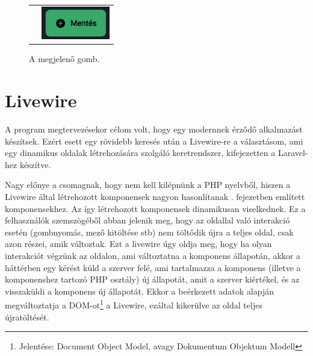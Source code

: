 \documentclass[
]{thesis-ekf}
\theoremstyle{definition}
\theoremstyle{remark}
\begin{document}
\begin{figure}[ht!]
	\begin{tabular}{p{}p{}}
		\begin{minipage}{.6\textwidth}
			
		\end{minipage}
		&
		\begin{minipage}{.4\textwidth}
			\centering
			\caption{A megjelenő gomb.}
			\includegraphics[width=3cm]{../pictures/screenshots/button.png}
			\label{button}
		\end{minipage}
		
	\end{tabular}
\end{figure}

\section{Livewire}
\label{livewireSection}

A program megtervezésekor célom volt, hogy egy modernnek érződő alkalmazást készítsek. Ezért esett egy rövidebb keresés után a Livewire-re a választásom, ami egy dinamikus oldalak létrehozására szolgáló keretrendszer, kifejezetten a Laravel-hez készítve.\cite{livewire}

Nagy előnye a csomagnak, hogy nem kell kilépnünk a PHP nyelvből, hiszen a Livewire által létrehozott komponensek nagyon hasonlítanak . fejezetben említett komponensekhez. Az így létrehozott komponensek dinamikusan viselkednek. Ez a felhasználók szemszögéből abban jelenik meg, hogy az oldallal való interakció esetén (gombnyomás, mező kitöltése stb) nem töltődik újra a teljes oldal, csak azon részei, amik változtak. Ezt a livewire úgy oldja meg, hogy ha olyan interakciót végzünk az oldalon, ami változtatna a komponens állapotán, akkor a háttérben egy kérést küld a szerver felé, ami tartalmazza a komponens (illetve a komponenshez tartozó PHP osztály) új állapotát, amit a szerver kiértékel, és az visszaküldi a komponens új állapotát. Ekkor a beérkezett adatok alapján megváltoztatja a DOM-ot\footnote{Jelentése: Document Object Model, avagy Dokumentum Objektum Modell\cite{dom}} a Livewire, ezáltal kikerülve az oldal teljes újratöltését.
\end{document}
